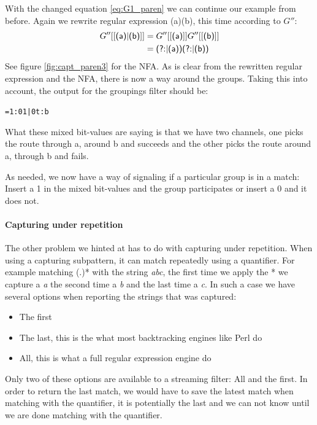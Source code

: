 \begin{example}[continues=ex:capturing_under_alternation]
With the changed equation \ref{eq:G1_paren} we can continue our
example from before. Again we rewrite regular expression
\textsf{(a)\textbar (b)}, this time according to $G''$:
  \begin{align*}
    G''[[\text{\textsf{(a)\textbar (b)}}]] &=
    G''[[\text{\textsf{(a)}}]]G''[[\text{\textsf{(b)}}]] \\
    &= \text{\textsf{(?:\textbar (a))(?:\textbar (b))}} \\
  \end{align*}
  See figure \vref{fig:capt_paren3} for the NFA. As is clear from the
  rewritten regular expression and the NFA, there is now a way around
  the groups. Taking this into account, the output for the groupings
  filter should be: 
  \begin{center}\texttt{=1:01|0t:b}\end{center}
  What these mixed bit-values are saying is that we have two channels,
  one picks the route through \textsf{a}, around \textsf{b} and
  succeeds and the other picks the route around \textsf{a}, through
  \textsf{b} and fails.
\end{example}
As needed, we now have a way of signaling if a particular group is in
a match: Insert a 1 in the mixed bit-values and the group participates
or insert a 0 and it does not. 


\paragraph{Capturing under repetition}
The other problem we hinted at has to do with capturing under
repetition. When using a capturing subpattern, it can match repeatedly
using a quantifier. For example matching \textsf{(.)*} with the string
\textsl{abc}, the first time we apply the \textsf{*} we capture a
\textsl{a} the second time a \textsl{b} and the last time a
\textsl{c}. In such a case we have several options when reporting the
strings that was captured:
\begin{itemize}
\item The first
\item The last, this is the what most backtracking engines like Perl
  do
\item All, this is what a full regular expression engine do
\end{itemize}
Only two of these options are available to a streaming filter: All and
the first. In order to return the last match, we would have to save
the latest match when matching with the quantifier, it is potentially
the last and we can not know until we are done matching with the
quantifier.

